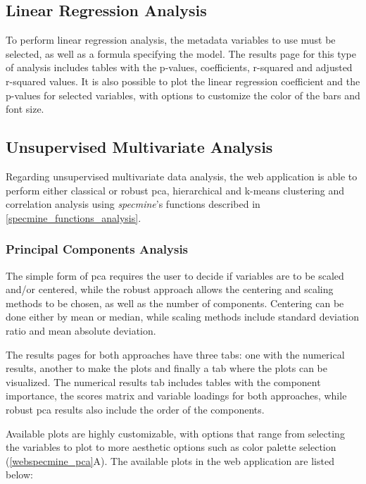 \subsection{Linear Regression Analysis}

To perform linear regression analysis, the metadata variables to use must be selected, as well as a formula specifying the model. The results page for this type of analysis includes tables with the p-values, coefficients, r-squared and adjusted r-squared values. It is also possible to plot the linear regression coefficient and the p-values for selected variables, with options to customize the color of the bars and font size.



\subsection{Unsupervised Multivariate Analysis}

Regarding unsupervised multivariate data analysis, the web application is able to perform either classical or robust \gls{pca}, hierarchical and k-means clustering and correlation analysis using \textit{specmine}'s functions described in \autoref{specmine_functions_analysis}.


\subsubsection{Principal Components Analysis}

The simple form of \gls{pca} requires the user to decide if variables are to be scaled and/or centered, while the robust approach allows the centering and scaling methods to be chosen, as well as the number of components. Centering can be done either by mean or median, while scaling methods include standard deviation ratio and mean absolute deviation.

The results pages for both approaches have three tabs: one with the numerical results, another to make the plots and finally a tab where the plots can be visualized. The numerical results tab includes tables with the component importance, the scores matrix and variable loadings for both approaches, while robust \gls{pca} results also include the order of the components.

Available plots are highly customizable, with options that range from selecting the variables to plot to more aesthetic options such as color palette selection (\autoref{webspecmine_pca}A). The available plots in the web application are listed below:

